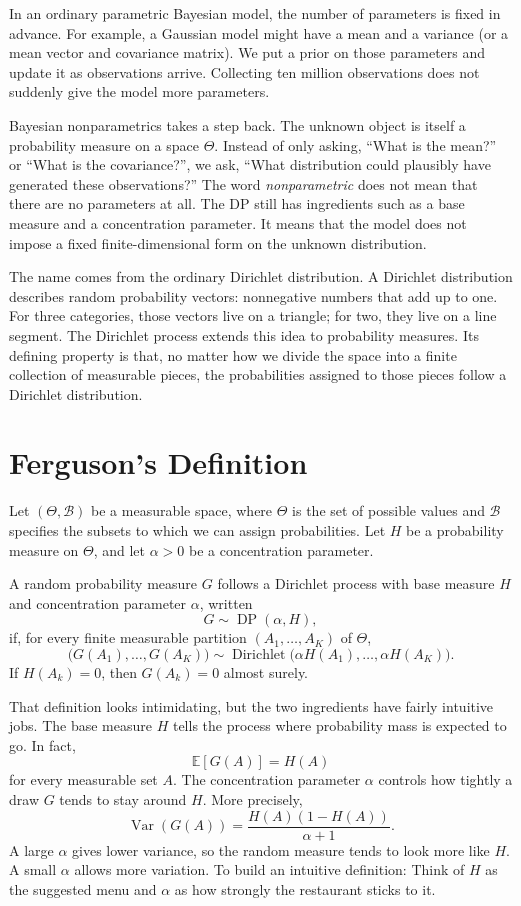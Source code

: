 \documentclass[11pt]{article}
\begin{document}
In an ordinary parametric Bayesian model, the number of parameters is fixed in advance. For example, a Gaussian model might have a mean and a variance (or a mean vector and covariance matrix). We put a prior on those parameters and update it as observations arrive. Collecting ten million observations does not suddenly give the model more parameters.

Bayesian nonparametrics takes a step back. The unknown object is itself a probability measure on a space \(\Theta\). Instead of only asking, ``What is the mean?'' or ``What is the covariance?'', we ask, ``What distribution could plausibly have generated these observations?'' The word \emph{nonparametric} does not mean that there are no parameters at all. The DP still has ingredients such as a base measure and a concentration parameter. It means that the model does not impose a fixed finite-dimensional form on the unknown distribution.

The name comes from the ordinary Dirichlet distribution. A Dirichlet distribution describes random probability vectors: nonnegative numbers that add up to one. For three categories, those vectors live on a triangle; for two, they live on a line segment. The Dirichlet process extends this idea to probability measures. Its defining property is that, no matter how we divide the space into a finite collection of measurable pieces, the probabilities assigned to those pieces follow a Dirichlet distribution.

\section*{Ferguson's Definition}

Let \((\Theta,\mathcal{B})\) be a measurable space, where \(\Theta\) is the set of possible values and \(\mathcal{B}\) specifies the subsets to which we can assign probabilities. Let \(H\) be a probability measure on \(\Theta\), and let \(\alpha>0\) be a concentration parameter.

A random probability measure \(G\) follows a Dirichlet process with base measure \(H\) and concentration parameter \(\alpha\), written
\[
G\sim\operatorname{DP}(\alpha,H),
\]
if, for every finite measurable partition \((A_1,\ldots,A_K)\) of \(\Theta\),
\[
\bigl(G(A_1),\ldots,G(A_K)\bigr)
\sim
\operatorname{Dirichlet}\bigl(
\alpha H(A_1),\ldots,\alpha H(A_K)
\bigr).
\]
If \(H(A_k)=0\), then \(G(A_k)=0\) almost surely.

That definition looks intimidating, but the two ingredients have fairly intuitive jobs. The base measure \(H\) tells the process where probability mass is expected to go. In fact,
\[
\mathbb{E}[G(A)]=H(A)
\]
for every measurable set \(A\). The concentration parameter \(\alpha\) controls how tightly a draw \(G\) tends to stay around \(H\). More precisely,
\[
\operatorname{Var}(G(A))
=
\frac{H(A)(1-H(A))}{\alpha+1}.
\]
A large \(\alpha\) gives lower variance, so the random measure tends to look more like \(H\). A small \(\alpha\) allows more variation. To build an intuitive definition: Think of \(H\) as the suggested menu and \(\alpha\) as how strongly the restaurant sticks to it.
\end{document}
